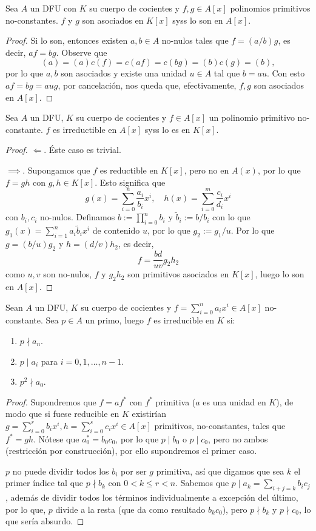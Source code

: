 \documentclass[11pt,oneside]{book}
\begin{document}
\begin{lem}
Sea $A$ un DFU con $K$ su cuerpo de cocientes y $f,g\in A[x]$ polinomios primitivos no-constantes. $f$ y $g$ son asociados en $K[x]$ syss lo son en $A[x]$.
\end{lem}
\begin{proof}
Si lo son, entonces existen $a,b\in A$ no-nulos tales que $f=(a/b)g$, es decir, $af=bg$. Observe que
$$(a)=(a)c(f)=c(af)=c(bg)=(b)c(g)=(b),$$
por lo que $a,b$ son asociados y existe una unidad $u\in A$ tal que $b=au$. Con esto $af=bg=aug$, por cancelación, nos queda que, efectivamente, $f,g$ son asociados en $A[x]$.
\end{proof}
\begin{thm}
Sea $A$ un DFU, $K$ su cuerpo de cocientes y $f\in A[x]$ un polinomio primitivo no-constante. $f$ es irreductible en $A[x]$ syss lo es en $K[x]$.
\end{thm}
\begin{proof}
$\Longleftarrow$. Éste caso es trivial.

$\implies$. Supongamos que $f$ es reductible en $K[x]$, pero no en $A(x)$, por lo que $f=gh$ con $g,h\in K[x]$. Esto significa que
$$g(x)=\sum_{i=0}^n\frac{a_i}{b_i}x^i,\quad h(x)=\sum_{i=0}^m\frac{c_i}{d_i}x^i$$
con $b_i,c_i$ no-nulos. Definamos $b:=\prod_{i=0}^n b_i$ y $\tilde{b}_i:=b/b_i$ con lo que $g_1(x)=\sum_{i=1}^n a_i\tilde{b}_ix^i$ de contenido $u$, por lo que $g_2:=g_1/u$. Por lo que $g=(b/u)g_2$ y $h=(d/v)h_2$, es decir,
$$f=\frac{bd}{uv}g_2h_2$$
como $u,v$ son no-nulos, $f$ y $g_2h_2$ son primitivos asociados en $K[x]$, luego lo son en $A[x]$.
\end{proof}
\begin{thm}
Sean $A$ un DFU, $K$ su cuerpo de cocientes y $f=\sum_{i=0}^n a_ix^i\in A[x]$ no-constante. Sea $p\in A$ un primo, luego $f$ es irreducible en $K$ si:
	\begin{enumerate}
	\item $p\nmid a_n$.
	\item $p\mid a_i$ para $i=0,1,\dots,n-1$.
	\item $p^2\nmid a_0$.
	\end{enumerate}
\end{thm}
\begin{proof}
Supondremos que $f=af^*$ con $f^*$ primitiva ($a$ es una unidad en $K$), de modo que si fuese reducible en $K$ existirían $g=\sum_{i=0}^rb_ix^i,h=\sum_{i=0}^sc_ix^i\in A[x]$ primitivos, no-constantes, tales que $f^*=gh$. Nótese que $a^*_0=b_0c_0$, por lo que $p\mid b_0$ o $p\mid c_0$, pero no ambos (restricción por construcción), por ello supondremos el primer caso.

$p$ no puede dividir todos los $b_i$ por ser $g$ primitiva, así que digamos que sea $k$ el primer índice tal que $p\nmid b_k$ con $0\lt k\leq r\lt n$. Sabemos que $p\mid a_k=\sum_{i+j=k}b_ic_j$, además de dividir todos los términos individualmente a excepción del último, por lo que, $p$ divide a la resta (que da como resultado $b_kc_0$), pero $p\nmid b_k$ y $p\nmid c_0$, lo que sería absurdo. 
\end{proof}
\end{document}
